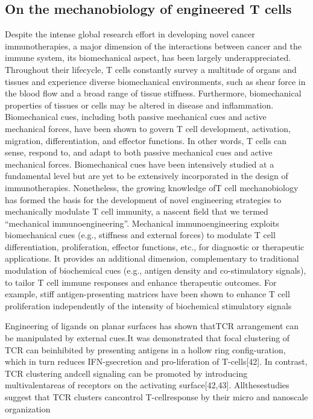 \subsection{On the mechanobiology of engineered T cells}

Despite the intense global research effort in developing novel cancer immunotherapies, a major dimension of the interactions between cancer and the immune system, its biomechanical aspect, has been largely underappreciated. Throughout their lifecycle, T cells constantly survey a multitude of organs and tissues and experience diverse biomechanical environments, such as shear force in the blood flow and a broad range of tissue stiffness. Furthermore, biomechanical properties of tissues or cells may be altered in disease and inflammation. Biomechanical cues, including both passive mechanical cues and active mechanical forces, have been shown to govern T cell development, activation, migration, differentiation, and effector functions. In other words, T cells can sense, respond to, and adapt to both passive mechanical cues and active mechanical forces. Biomechanical cues have been intensively studied at a fundamental level but are yet to be extensively incorporated in the design of immunotherapies. Nonetheless, the growing knowledge ofT cell mechanobiology has formed the basis for the development of novel engineering strategies to mechanically modulate T cell immunity, a nascent field that we termed “mechanical immunoengineering”. Mechanical immunoengineering exploits biomechanical cues (e.g., stiffness and external forces) to modulate T cell differentiation, proliferation, effector functions, etc., for diagnostic or therapeutic applications. It provides an additional dimension, complementary to traditional modulation of biochemical cues (e.g., antigen density and co-stimulatory signals), to tailor T cell immune responses and enhance therapeutic outcomes. For example, stiff antigen-presenting matrices have been shown to enhance T cell proliferation independently of the intensity of biochemical stimulatory signals \cite{Lei2020}

Engineering of ligands on planar surfaces has shown thatTCR arrangement can be manipulated by external cues.It was demonstrated that focal clustering of TCR can beinhibited by presenting antigens in a hollow ring config-uration, which in turn reduces IFN-gsecretion and pro-liferation of T-cells[42]. In contrast, TCR clustering andcell signaling can be promoted by introducing multivalentareas of receptors on the activating surface[42,43]. Allthesestudies suggest that TCR clusters cancontrol T-cellresponse by their micro and nanoscale organization \cite{Aramesh2019}

